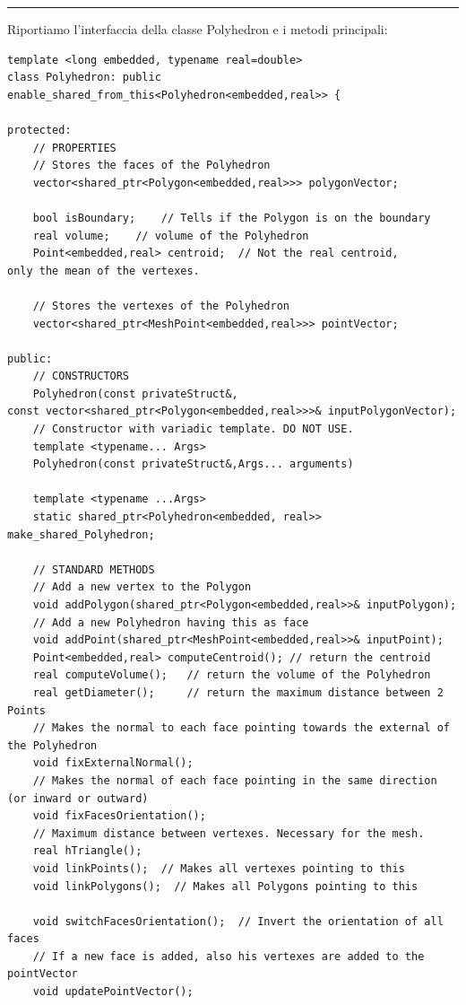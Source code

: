 \documentclass[oneside,12pt]{book}  %
\theoremstyle{plain}
\theoremstyle{definition}
\theoremstyle{remark}
\numberwithin{equation}{chapter} %
\begin{document}
\noindent\rule{14cm}{1pt}

Riportiamo l'interfaccia della classe Polyhedron e i metodi principali:

\begin{verbatim}
template <long embedded, typename real=double>
class Polyhedron: public enable_shared_from_this<Polyhedron<embedded,real>> {

protected:
    // PROPERTIES
    // Stores the faces of the Polyhedron
    vector<shared_ptr<Polygon<embedded,real>>> polygonVector; 
	
    bool isBoundary;	// Tells if the Polygon is on the boundary
    real volume;	// volume of the Polyhedron
    Point<embedded,real> centroid;	// Not the real centroid, 
only the mean of the vertexes.

    // Stores the vertexes of the Polyhedron
    vector<shared_ptr<MeshPoint<embedded,real>>> pointVector;	

public:
    // CONSTRUCTORS
    Polyhedron(const privateStruct&,
const vector<shared_ptr<Polygon<embedded,real>>>& inputPolygonVector);
    // Constructor with variadic template. DO NOT USE.
    template <typename... Args>
    Polyhedron(const privateStruct&,Args... arguments)

    template <typename ...Args>
    static shared_ptr<Polyhedron<embedded, real>>
make_shared_Polyhedron;

    // STANDARD METHODS
    // Add a new vertex to the Polygon
    void addPolygon(shared_ptr<Polygon<embedded,real>>& inputPolygon);
    // Add a new Polyhedron having this as face
    void addPoint(shared_ptr<MeshPoint<embedded,real>>& inputPoint);
    Point<embedded,real> computeCentroid();	// return the centroid
    real computeVolume();	// return the volume of the Polyhedron
    real getDiameter();		// return the maximum distance between 2 Points
    // Makes the normal to each face pointing towards the external of the Polyhedron
    void fixExternalNormal();	
    // Makes the normal of each face pointing in the same direction (or inward or outward)
    void fixFacesOrientation();	
    // Maximum distance between vertexes. Necessary for the mesh.
    real hTriangle();	
    void linkPoints();	// Makes all vertexes pointing to this
    void linkPolygons();  // Makes all Polygons pointing to this

    void switchFacesOrientation();	// Invert the orientation of all faces
    // If a new face is added, also his vertexes are added to the pointVector
    void updatePointVector();	


\end{verbatim}
\end{document}
